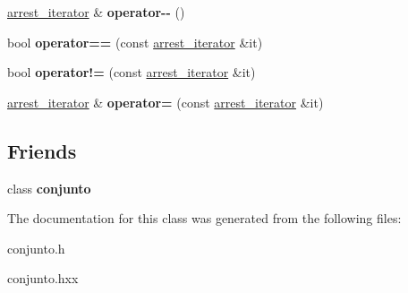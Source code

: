 \begin{DoxyCompactItemize}
\item 
\hypertarget{classconjunto_1_1arrest__iterator_a6a458e308863274b4f84dc70a49f9610}{\hyperlink{classconjunto_1_1arrest__iterator}{arrest\-\_\-iterator} \& {\bfseries operator-\/-\/} ()}\label{classconjunto_1_1arrest__iterator_a6a458e308863274b4f84dc70a49f9610}

\item 
\hypertarget{classconjunto_1_1arrest__iterator_aade6dffd9f9567f028924df6b3bb6df4}{bool {\bfseries operator==} (const \hyperlink{classconjunto_1_1arrest__iterator}{arrest\-\_\-iterator} \&it)}\label{classconjunto_1_1arrest__iterator_aade6dffd9f9567f028924df6b3bb6df4}

\item 
\hypertarget{classconjunto_1_1arrest__iterator_a5d0132bc8c7b409b1dced9de2a5ab895}{bool {\bfseries operator!=} (const \hyperlink{classconjunto_1_1arrest__iterator}{arrest\-\_\-iterator} \&it)}\label{classconjunto_1_1arrest__iterator_a5d0132bc8c7b409b1dced9de2a5ab895}

\item 
\hypertarget{classconjunto_1_1arrest__iterator_a164a937d3edda14e50b97621bbf18a65}{\hyperlink{classconjunto_1_1arrest__iterator}{arrest\-\_\-iterator} \& {\bfseries operator=} (const \hyperlink{classconjunto_1_1arrest__iterator}{arrest\-\_\-iterator} \&it)}\label{classconjunto_1_1arrest__iterator_a164a937d3edda14e50b97621bbf18a65}

\end{DoxyCompactItemize}
\subsection*{Friends}
\begin{DoxyCompactItemize}
\item 
\hypertarget{classconjunto_1_1arrest__iterator_a42fdcda39c77eabd7380e29fcdbe5dd2}{class {\bfseries conjunto}}\label{classconjunto_1_1arrest__iterator_a42fdcda39c77eabd7380e29fcdbe5dd2}

\end{DoxyCompactItemize}


The documentation for this class was generated from the following files\-:\begin{DoxyCompactItemize}
\item 
conjunto.\-h\item 
conjunto.\-hxx\end{DoxyCompactItemize}

